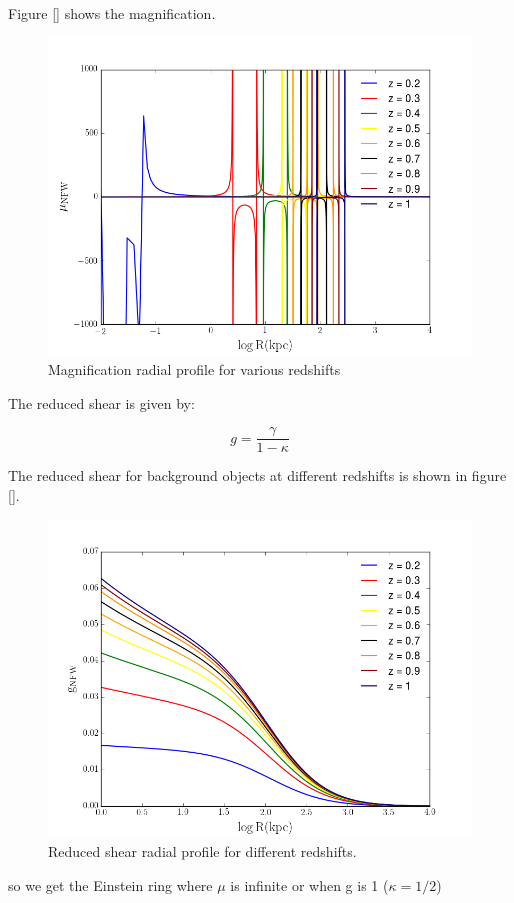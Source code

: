 Figure [] shows the magnification.

\begin{figure}[H]
\centering
\includegraphics[width=12cm]{images/Magnification.png}
\caption[Magnification radial profile]{Magnification radial profile for various redshifts}
\end{figure}

The reduced shear is given by:

\begin{equation}
g=\frac{\gamma}{1-\kappa}
\end{equation}

The reduced shear for background objects at different redshifts is shown in figure []. 

\begin{figure}[H]
\centering
\includegraphics[width=12cm]{images/Reduced_Shear.png}
\caption[Reduced shear radial]{Reduced shear radial profile for different redshifts.}
\end{figure}

so we get the Einstein ring where $\mu$ is infinite or when g is 1 ($\kappa=1/2$)
